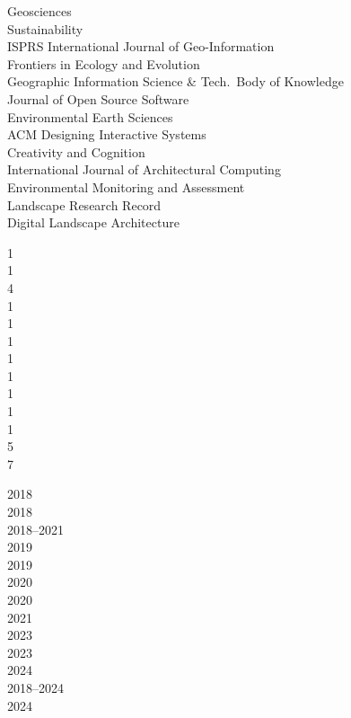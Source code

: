 \documentclass[10pt]{designcv}
\begin{document}

\begin{minipage}[t]{0.65\textwidth}
Geosciences\\
Sustainability\\
ISPRS International Journal of Geo-Information\\
Frontiers in Ecology and Evolution\\
Geographic Information Science \& Tech.~Body of Knowledge\\
Journal of Open Source Software\\
Environmental Earth Sciences\\
ACM Designing Interactive Systems\\
Creativity and Cognition\\
International Journal of Architectural Computing\\
Environmental Monitoring and Assessment\\
Landscape Research Record\\
Digital Landscape Architecture\\
\end{minipage}
\hfill
\begin{minipage}[t]{0.05\textwidth}
1\\
1\\
4\\
1\\
1\\
1\\
1\\
1\\
1\\
1\\
1\\
5\\
7\\
\end{minipage}
\hfill
\begin{minipage}[t]{0.15\textwidth}
2018\\
2018\\
2018--2021\\
2019\\
2019\\
2020\\
2020\\
2021\\
2023\\
2023\\
2024\\
2018--2024\\
2024\\
\end{minipage}
\end{document}
